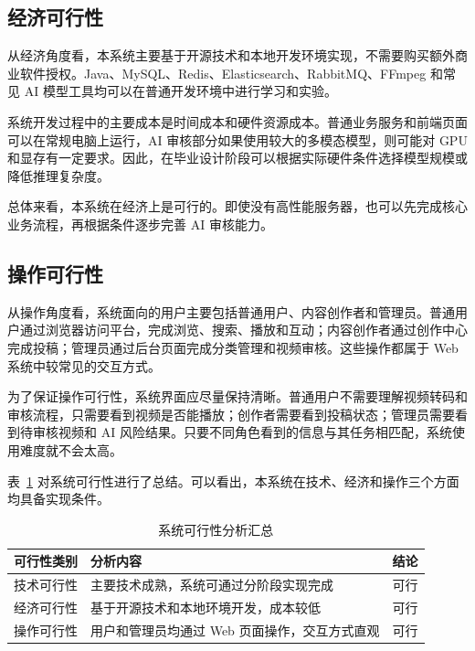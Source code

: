 \subsection{经济可行性}
\label{subsec:economic-feasibility}

从经济角度看，本系统主要基于开源技术和本地开发环境实现，不需要购买额外商业软件授权。Java、MySQL、Redis、Elasticsearch、RabbitMQ、FFmpeg 和常见 AI 模型工具均可以在普通开发环境中进行学习和实验。

系统开发过程中的主要成本是时间成本和硬件资源成本。普通业务服务和前端页面可以在常规电脑上运行，AI 审核部分如果使用较大的多模态模型，则可能对 GPU 和显存有一定要求。因此，在毕业设计阶段可以根据实际硬件条件选择模型规模或降低推理复杂度。

总体来看，本系统在经济上是可行的。即使没有高性能服务器，也可以先完成核心业务流程，再根据条件逐步完善 AI 审核能力。

\subsection{操作可行性}
\label{subsec:operational-feasibility}

从操作角度看，系统面向的用户主要包括普通用户、内容创作者和管理员。普通用户通过浏览器访问平台，完成浏览、搜索、播放和互动；内容创作者通过创作中心完成投稿；管理员通过后台页面完成分类管理和视频审核。这些操作都属于 Web 系统中较常见的交互方式。

为了保证操作可行性，系统界面应尽量保持清晰。普通用户不需要理解视频转码和审核流程，只需要看到视频是否能播放；创作者需要看到投稿状态；管理员需要看到待审核视频和 AI 风险结果。只要不同角色看到的信息与其任务相匹配，系统使用难度就不会太高。

表~\ref{tab:feasibility-summary} 对系统可行性进行了总结。可以看出，本系统在技术、经济和操作三个方面均具备实现条件。

\begin{table}[htbp]
  \centering
  \caption{系统可行性分析汇总}
  \label{tab:feasibility-summary}
  \begin{tabular}{p{}p{}p{}}
    \hline
    \textbf{可行性类别} & \textbf{分析内容} & \textbf{结论} \\
    \hline
    技术可行性 & 主要技术成熟，系统可通过分阶段实现完成 & 可行 \\
    经济可行性 & 基于开源技术和本地环境开发，成本较低 & 可行 \\
    操作可行性 & 用户和管理员均通过 Web 页面操作，交互方式直观 & 可行 \\
    \hline
  \end{tabular}
\end{table}

